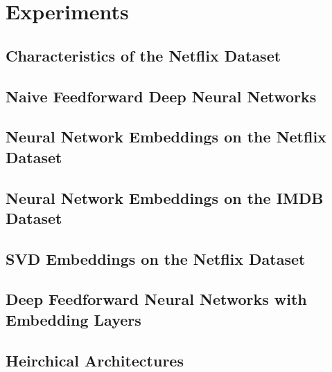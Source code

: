 \section{Experiments}
\subsection{Characteristics of the Netflix Dataset}
\subsection{Naive Feedforward Deep Neural Networks}
\subsection{Neural Network Embeddings on the Netflix Dataset}
\subsection{Neural Network Embeddings on the IMDB Dataset}
\subsection{SVD Embeddings on the Netflix Dataset}
\subsection{Deep Feedforward Neural Networks with Embedding Layers}
\subsection{Heirchical Architectures}
